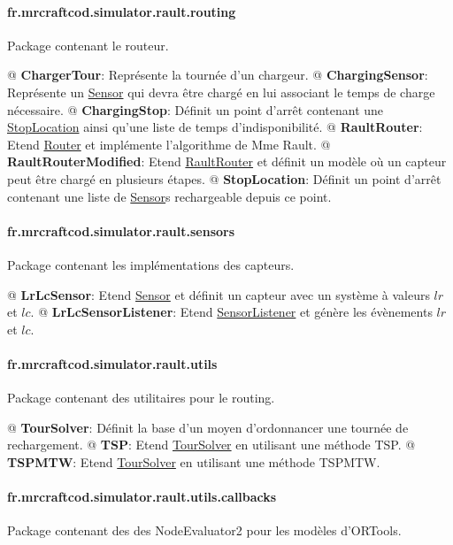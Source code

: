 \documentclass[final]{polytech/polytech}
\newcommand{\class}[1]{\textbf{#1}\label{class:#1}}
\newcommand{\klass}[1]{\hyperref[class:#1]{#1}}
\begin{document}
			\paragraph{fr.mrcraftcod.simulator.rault.routing}
				Package contenant le routeur.
				
				\begin{easylist}
					@ \class{ChargerTour}: Représente la tournée d'un chargeur.
					@ \class{ChargingSensor}: Représente un \klass{Sensor} qui devra être chargé en lui associant le temps de charge nécessaire.
					@ \class{ChargingStop}: Définit un point d'arrêt contenant une \klass{StopLocation} ainsi qu'une liste de temps d'indisponibilité.
					@ \class{RaultRouter}: Etend \klass{Router} et implémente l'algorithme de Mme Rault.
					@ \class{RaultRouterModified}: Etend \klass{RaultRouter} et définit un modèle où un capteur peut être chargé en plusieurs étapes.
					@ \class{StopLocation}: Définit un point d'arrêt contenant une liste de \klass{Sensor}s rechargeable depuis ce point.
				\end{easylist}
			
			\paragraph{fr.mrcraftcod.simulator.rault.sensors}
				Package contenant les implémentations des capteurs.
				
				\begin{easylist}
					@ \class{LrLcSensor}: Etend \klass{Sensor} et définit un capteur avec un système à valeurs $lr$ et $lc$.
					@ \class{LrLcSensorListener}: Etend \klass{SensorListener} et génère les évènements $lr$ et $lc$.
				\end{easylist}
			
			\paragraph{fr.mrcraftcod.simulator.rault.utils}
				Package contenant des utilitaires pour le routing.
				
				\begin{easylist}
					@ \class{TourSolver}: Définit la base d'un moyen d'ordonnancer une tournée de rechargement.
					@ \class{TSP}: Etend \klass{TourSolver} en utilisant une méthode TSP.
					@ \class{TSPMTW}: Etend \klass{TourSolver} en utilisant une méthode TSPMTW.
				\end{easylist}
				
			\paragraph{fr.mrcraftcod.simulator.rault.utils.callbacks}
				Package contenant des des NodeEvaluator2 pour les modèles d'ORTools.
				
\end{document}

